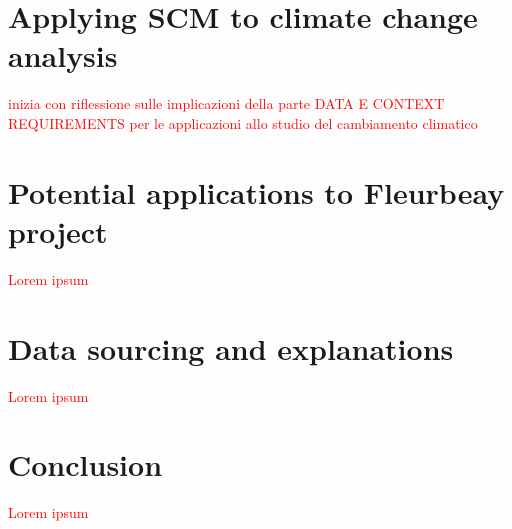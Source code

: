 \documentclass[12pt,a4paper,draft]{article}
\begin{document}
\section{Applying SCM to climate change analysis}
\textcolor{red}{inizia con riflessione sulle implicazioni della parte DATA E CONTEXT
REQUIREMENTS per le applicazioni allo studio del cambiamento climatico}









\section{Potential applications to Fleurbeay project}
\textcolor{red}{Lorem ipsum}








\section{Data sourcing and explanations}
\textcolor{red}{Lorem ipsum}









\section{Conclusion}
\textcolor{red}{Lorem ipsum}







\newpage
\end{document}
